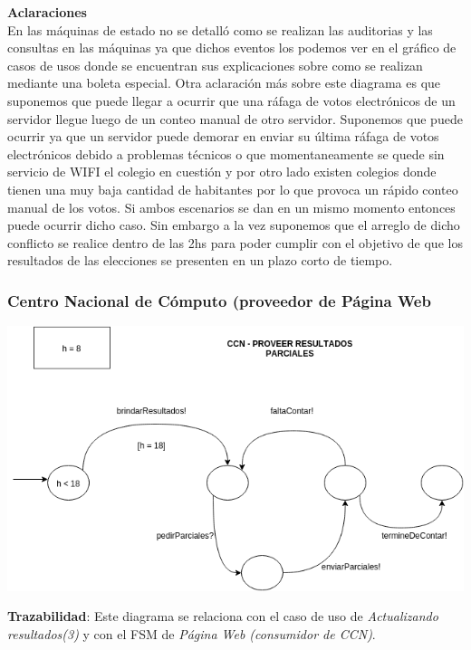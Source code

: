 \documentclass[spanish, 10pt,a4paper]{article}
\numberwithin{equation}{section} %
\begin{document}
\clearpage

\noindent\textbf{Aclaraciones}\\

En las máquinas de estado no se detalló como se realizan las auditorias y las consultas en las máquinas ya que dichos eventos los podemos ver en el gráfico de casos de usos donde se encuentran sus explicaciones sobre como se realizan mediante una boleta especial.
Otra aclaración más sobre este diagrama es que suponemos que puede llegar a ocurrir que una ráfaga de votos electrónicos de un servidor llegue luego de un conteo manual de otro servidor. Suponemos que puede ocurrir ya que un servidor puede demorar en enviar su última ráfaga de votos electrónicos debido a problemas técnicos o que momentaneamente se quede sin servicio de WIFI el colegio en cuestión y por otro lado existen colegios donde tienen una muy baja cantidad de habitantes por lo que provoca un rápido conteo manual de los votos. Si ambos escenarios se dan en un mismo momento entonces puede ocurrir dicho caso. Sin embargo a la vez suponemos que el arreglo de dicho conflicto se realice dentro de las 2hs para poder cumplir con el objetivo de que los resultados de las elecciones se presenten en un plazo corto de tiempo.
\subsubsection{Centro Nacional de Cómputo (proveedor de Página Web}
\vspace{\baselineskip}
    \begin{center}
                \includegraphics[scale=0.50]{imagenes/fsm/FSMCCNProveedordeWeb2.png}
                \\
                \vspace{1pt}
                \footnotesize\textit{}
        \end{center}
\vspace{\baselineskip}
\vspace{-10px}
\noindent\textbf{Trazabilidad}: Este diagrama se relaciona con el caso de uso de \textit{Actualizando resultados(3)} y con el FSM de \textit{Página Web (consumidor de CCN)}.\\
\end{document}

